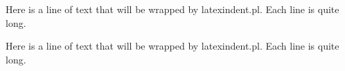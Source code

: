 Here is a line of text that will be wrapped by latexindent.pl. Each line is quite long.

Here is a line of text that will be wrapped by latexindent.pl. Each line is quite long.
